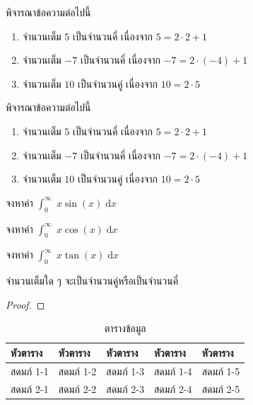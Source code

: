 \begin{content}
\begin{example}
พิจารณาข้อความต่อไปนี้
\begin{enumerate}
	\item จำนวนเต็ม $5$ เป็นจำนวนคี่ เนื่องจาก $5 = 2\cdot 2 + 1$
	\item จำนวนเต็ม $-7$ เป็นจำนวนคี่ เนื่องจาก $-7 = 2\cdot (-4) + 1$
	\item จำนวนเต็ม $10$ เป็นจำนวนคู่ เนื่องจาก $10 = 2\cdot 5$
\end{enumerate}	
\end{example}

\begin{example}
พิจารณาข้อความต่อไปนี้
\begin{enumerate}
	\item จำนวนเต็ม $5$ เป็นจำนวนคี่ เนื่องจาก $5 = 2\cdot 2 + 1$
	\item จำนวนเต็ม $-7$ เป็นจำนวนคี่ เนื่องจาก $-7 = 2\cdot (-4) + 1$
	\item จำนวนเต็ม $10$ เป็นจำนวนคู่ เนื่องจาก $10 = 2\cdot 5$
\end{enumerate}	
\end{example}


\begin{example}
จงหาค่า $\displaystyle\int_{0}^{\infty}\;x\sin(x) \;\mathrm{d}x$
\vspace{3cm}	
\end{example}

\begin{example}
จงหาค่า $\displaystyle\int_{0}^{\infty}\;x\cos(x) \;\mathrm{d}x$
\vspace{6cm}	
\end{example}

\begin{example}
จงหาค่า $\displaystyle\int_{0}^{\infty}\;x\tan(x) \;\mathrm{d}x$
\vspace{9cm}	
\end{example}

\begin{theorem}
จำนวนเต็มใด ๆ จะเป็นจำนวนคู่หรือเป็นจำนวนคี่	
\end{theorem}
\begin{proof}
\end{proof}


\begin{table}[h]
\centering
\begin{tabular}{|l|l|l|l|l|}
\hline
หัวตาราง & หัวตาราง & หัวตาราง & หัวตาราง & หัวตาราง \\ \hline
สดมภ์ 1-1 & สดมภ์ 1-2 & สดมภ์ 1-3 & สดมภ์ 1-4 & สดมภ์ 1-5  \\ \hline 	
สดมภ์ 2-1 & สดมภ์ 2-2 & สดมภ์ 2-3 & สดมภ์ 2-4 & สดมภ์ 2-5  \\ \hline 
\end{tabular}
\caption{ตารางข้อมูล}	
\end{table}


\end{content}
